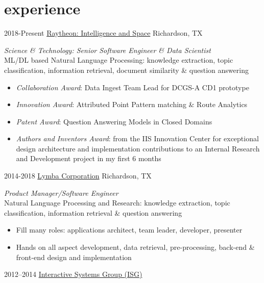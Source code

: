 \documentclass[]{friggeri-cv} %
\begin{document}

\section{experience }

\begin{entrylist}
\entry
{2018-Present}
{\href{http://www.raytheon.com}{Raytheon: Intelligence and Space}}
{Richardson, TX}
{\emph{Science \& Technology: Senior Software Engineer \& Data Scientist} \\
ML/DL based Natural Language Processing: knowledge extraction, topic classification, information retrieval, document similarity \& question answering
\begin{itemize}
\item \emph{Collaboration Award}: Data Ingest Team Lead for DCGS-A CD1 prototype 
\item \emph{Innovation Award}: Attributed Point Pattern matching \& Route Analytics
\item \emph{Patent Award}: Question Answering Models in Closed Domains
\item \emph{Authors and Inventors Award}: from the IIS Innovation Center for exceptional design architecture and implementation contributions to an Internal Research and Development project in my first 6 months
\end{itemize}}
\entry
{2014-2018}
{\href{http://www.lymba.com}{Lymba Corporation}}
{Richardson, TX}
{\emph{Product Manager/Software Engineer} \\
Natural Language Processing and Research: knowledge extraction, topic classification, information retrieval \& question answering
\begin{itemize}
\item Fill many roles: applications architect, team leader, developer, presenter
\end{itemize}
\begin{itemize}
\item Hands on all aspect development, data retrieval, pre-processing, back-end \& front-end design and implementation
\end{itemize}}
\entry
{2012--2014}
{\href{http://isg.cs.utep.edu/}{Interactive Systems Group  {\normalfont (ISG)}}}

\end{entrylist}
\end{document}
